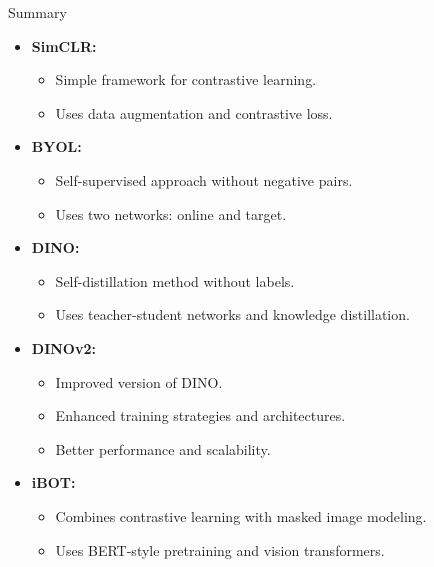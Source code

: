 \begin{frame}[allowframebreaks]{Summary}
\begin{itemize}
    \item \textbf{SimCLR:}
    \begin{itemize}
        \item Simple framework for contrastive learning.
        \item Uses data augmentation and contrastive loss.
    \end{itemize}
    \item \textbf{BYOL:}
    \begin{itemize}
        \item Self-supervised approach without negative pairs.
        \item Uses two networks: online and target.
    \end{itemize}
    \item \textbf{DINO:}
    \begin{itemize}
        \item Self-distillation method without labels.
        \item Uses teacher-student networks and knowledge distillation.
    \end{itemize}

    \framebreak

    \item \textbf{DINOv2:}
    \begin{itemize}
        \item Improved version of DINO.
        \item Enhanced training strategies and architectures.
        \item Better performance and scalability.
    \end{itemize}
    \item \textbf{iBOT:}
    \begin{itemize}
        \item Combines contrastive learning with masked image modeling.
        \item Uses BERT-style pretraining and vision transformers.
    \end{itemize}
\end{itemize}
\end{frame}